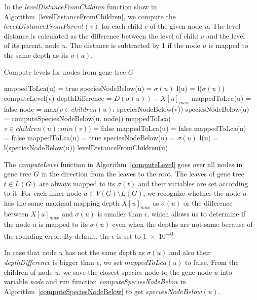 In the \emph{levelDistanceFromChildren} function show in Algorithm~\ref{levelDistanceFromChildren}, we compute the $levelDistanceFromParent(v)$ for each child $v$ of the given node $u$. The level distance is calculated as the difference between the level of child $v$ and the level of its parent, node $u$. The distance is subtracted by 1 if the node $u$ is mapped to the same depth as its $\sigma(u)$.

\begin{algorithm}
\caption{Compute levels for nodes from gene tree $G$} 
\label{computeLevel}
\begin{algorithmic}[1]
		\State mappedToLca(u) = true
		\State speciesNodeBelow(u) = $\sigma(u)$
		\State l(u) = l($\sigma(u)$)
	\Else
			\State computeLevel(v)
		\EndFor
		\State depthDifference = $D(\sigma(u)) - X[u]_{max}$
			\State mappedToLca(u) = false
			\State node = max($v \in children(u)$: speciesNodeBelow(v))
			\State speciesNodeBelow(u) = computeSpeciesNodeBelow(u, node))
		\Else
					\State mappedToLca($v \in children(u): min(v)$) = false
				\EndIf
				\State mappedToLca(u) = false
				\State mappedToLca(u) = false
			\Else
				\State mappedToLca(u) = true
			\EndIf
			\State speciesNodeBelow(u) = $\sigma(u)$
		\EndIf
		\State l(u) = l(speciesNodeBelow(u))
		\State levelDistanceFromChildren(u)
	\EndIf
\EndFunction
\end{algorithmic}
\end{algorithm}

The \emph{computeLevel} function in Algorithm~\ref{computeLevel} goes over all nodes in gene tree $G$ in the direction from the leaves to the root. The leaves of gene tree $t \in L(G)$ are always mapped to its $\sigma(t)$ and their variables are set according to it. For each inner node $u \in V(G) \setminus L(G)$, we recognize whether the node $u$ has the same maximal mapping depth $X[u]_{max}$ as $\sigma(u)$ or the difference between $X[u]_{max}$ and $\sigma(u)$ is smaller than $\epsilon$, which allows us to determine if the node $u$ is mapped to its $\sigma(u)$ even when the depths are not same because of the rounding error. By default, the $\epsilon$ is set to \num{1e-6}.

In case that node $u$ has not the same depth as $\sigma(u)$ and also their \emph{depthDifference} is bigger than $\epsilon$, we set $mappedToLca(u)$ to false. From the children of node $u$, we save the closest species node to the gene node $u$ into variable \emph{node} and run function \emph{computeSpeciesNodeBelow} in Algorithm~\ref{computeSpeciesNodeBelow} to get $speciesNodeBelow(u)$. 

